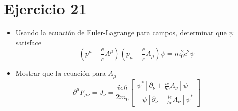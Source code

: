 \section*{Ejercicio 21}
\begin{itemize}
    \item Usando la ecuación de Euler-Lagrange para campos, determinar que $\psi$ satisface 
\begin{equation*}
    \left(p^\mu-\frac{e}{c}A^\mu\right) \left(p_\mu - \frac{e}{c} A_\mu \right) \psi = m_0^2c^2 \psi
\end{equation*}
    \item Mostrar que la ecuación para $A_\mu$
    \begin{equation*}
        \partial^\mu F_{\mu \nu} = J_\nu = \frac{ie\hbar}{2m_0} \left[\begin{matrix}
            \psi^* \left[\partial_\nu +\frac{ie}{\hbar c} A_\nu \right]\psi \\
            -\psi \left[\partial_\nu - \frac{ie}{\hbar c}A_\nu\right]\psi^*
        \end{matrix}
        \right]
    \end{equation*}
\end{itemize}
